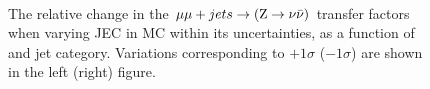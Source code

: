 \begin{figure}[!h]
  \centering
   ~~
  \\

  \caption{\label{fig:tfSyst_jec_mumuToZinv} The relative change in
  the $\mmj \rightarrow (\znunu)$ transfer
  factors when varying JEC in MC within its uncertainties, as a function of \scalht and jet category. 
  Variations corresponding to $+1\sigma$ ($-1\sigma$) are shown in the left (right) figure. 
  }
\end{figure}

